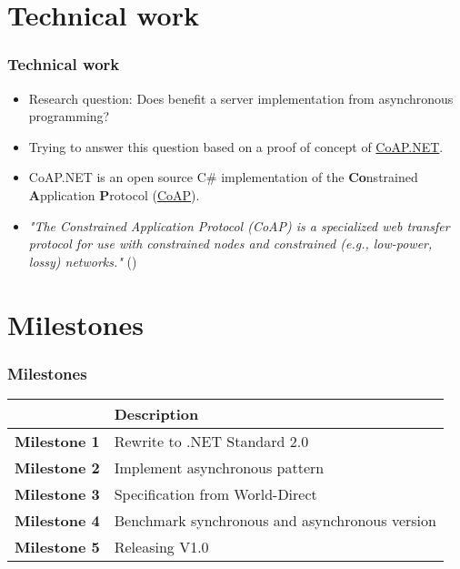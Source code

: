 \documentclass[xcolor=dvipsnames]{beamer}
\begin{document}
    \section{Technical work}
    \begin{frame}
        \frametitle{Technical work}
        \begin{itemize}
            \item Research question: Does benefit a server implementation from asynchronous programming?
            \item Trying to answer this question based on a proof of concept of \href{https://github.com/smeshlink/CoAP.NET}{CoAP.NET}.
            \item CoAP.NET is an open source C\# implementation of the \textbf{Co}nstrained \textbf{A}pplication \textbf{P}rotocol (\href{https://tools.ietf.org/html/rfc7252}{CoAP}).
            \item \textit{"The Constrained Application Protocol (CoAP) is a specialized web transfer protocol for use with constrained nodes and constrained (e.g., low-power, lossy) networks."} (\cite{RFC_7252_CoAP})
        \end{itemize}
    \end{frame}
    \section{Milestones}
    \begin{frame}
        \frametitle{Milestones}
        \begin{table}[]
            \begin{tabular}{ll}
                & \textbf{Description} \\ \hline
                \textbf{Milestone 1} & Rewrite to .NET Standard 2.0 \\ \hline
                \textbf{Milestone 2} & Implement asynchronous pattern \\ \hline
                \textbf{Milestone 3} & Specification from World-Direct \\ \hline
                \textbf{Milestone 4} & Benchmark synchronous and asynchronous version \\ \hline
                \textbf{Milestone 5} & Releasing V1.0 \\ \hline
            \end{tabular}
        \end{table}
    \end{frame}
\end{document}
